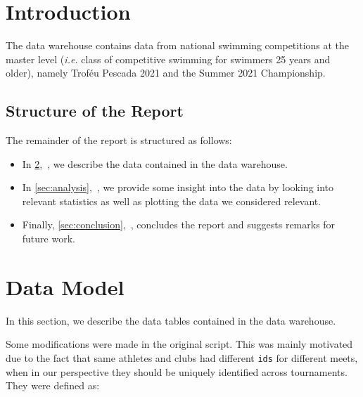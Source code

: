 \documentclass[a4paper, 11pt]{article}
\begin{document}
\pagebreak

\tableofcontents \pagebreak
\listoffigures \pagebreak


\section{Introduction}\label{sec:introduction}

The data warehouse contains data from national swimming competitions at the master level (\textit{i.e.} class of
competitive swimming for swimmers 25 years and older), namely Troféu Pescada 2021 and the Summer 2021 Championship.

\subsection*{Structure of the Report}

The remainder of the report is structured as follows:

\begin{itemize}
    \item In \cref{sec:data-model},~\textbf{}, we describe the data contained in the data warehouse.
    \item In \cref{sec:analysis},~\textbf{}, we provide some insight into the data by looking into relevant
    statistics as well as plotting the data we considered relevant.
    \item Finally, \cref{sec:conclusion},~\textbf{}, concludes the report and suggests remarks
    for future work.
\end{itemize}

\pagebreak

\section{Data Model} \label{sec:data-model}

In this section, we describe the data tables contained in the data warehouse. 

Some modifications were made in the original script. This was mainly motivated due to the fact that same athletes and clubs had different \texttt{ids} for different meets, when in our perspective they should be uniquely identified across tournaments. They were defined as: 
\end{document}
